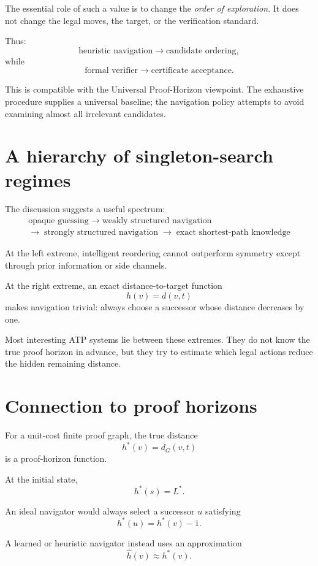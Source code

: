 \documentclass[11pt]{article}
\begin{document}
The essential role of such a value is to change the \emph{order of
exploration}. It does not change the legal moves, the target, or the
verification standard.

Thus:
\[
\text{heuristic navigation}
\longrightarrow
\text{candidate ordering},
\]
while
\[
\text{formal verifier}
\longrightarrow
\text{certificate acceptance}.
\]

This is compatible with the Universal Proof-Horizon viewpoint. The exhaustive
procedure supplies a universal baseline; the navigation policy attempts to
avoid examining almost all irrelevant candidates.

\section{A hierarchy of singleton-search regimes}

The discussion suggests a useful spectrum:
\[
\boxed{
\begin{gathered}
\text{opaque guessing}\;\longrightarrow\;\text{weakly structured navigation}\\
\longrightarrow\;\text{strongly structured navigation}\;\longrightarrow\;
\text{exact shortest-path knowledge}
\end{gathered}
}
\]

At the left extreme, intelligent reordering cannot outperform symmetry except
through prior information or side channels.

At the right extreme, an exact distance-to-target function
\[
h(v)=d(v,t)
\]
makes navigation trivial: always choose a successor whose distance decreases
by one.

Most interesting ATP systems lie between these extremes. They do not know the
true proof horizon in advance, but they try to estimate which legal actions
reduce the hidden remaining distance.

\section{Connection to proof horizons}

For a unit-cost finite proof graph, the true distance
\[
h^*(v)=d_G(v,t)
\]
is a proof-horizon function.

At the initial state,
\[
h^*(s)=L^*.
\]

An ideal navigator would always select a successor \(u\) satisfying
\[
h^*(u)=h^*(v)-1.
\]

A learned or heuristic navigator instead uses an approximation
\[
\widehat{h}(v)\approx h^*(v).
\]
\end{document}
